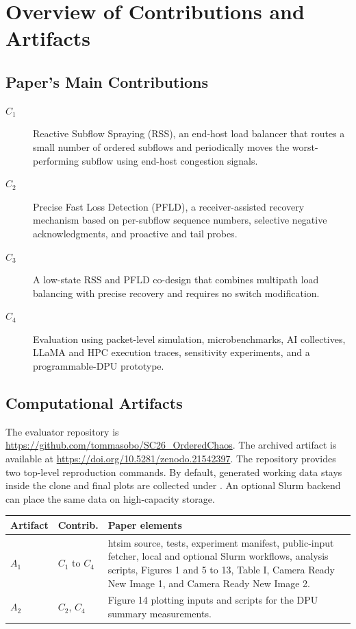 \documentclass[conference]{IEEEtran}
\begin{document}

\appendixAD
\section{Overview of Contributions and Artifacts}

\subsection{Paper's Main Contributions}
\begin{description}
\item[$C_1$] Reactive Subflow Spraying (RSS), an end-host load balancer that
routes a small number of ordered subflows and periodically moves the
worst-performing subflow using end-host congestion signals.
\item[$C_2$] Precise Fast Loss Detection (PFLD), a receiver-assisted recovery
mechanism based on per-subflow sequence numbers, selective negative
acknowledgments, and proactive and tail probes.
\item[$C_3$] A low-state RSS and PFLD co-design that combines multipath load
balancing with precise recovery and requires no switch modification.
\item[$C_4$] Evaluation using packet-level simulation, microbenchmarks, AI
collectives, LLaMA and HPC execution traces, sensitivity experiments, and a
programmable-DPU prototype.
\end{description}

\subsection{Computational Artifacts}
The evaluator repository is
\url{https://github.com/tommasobo/SC26_OrderedChaos}. The archived artifact is
available at \url{https://doi.org/10.5281/zenodo.21542397}. The repository
provides two top-level reproduction commands. By default, generated working
data stays inside the clone and final plots are collected under
. An optional Slurm backend can place the same data on
high-capacity storage.

\begin{center}
\footnotesize
\begin{tabular}{@{}p{}p{}p{}@{}}
\toprule
Artifact & Contrib. & Paper elements \\
\midrule
$A_1$ & $C_1$ to $C_4$ & htsim source, tests, experiment manifest, public-input
fetcher, local and optional Slurm workflows, analysis scripts, Figures 1 and
5 to 13, Table I,
Camera Ready New Image 1, and Camera Ready New Image 2. \\
\midrule
$A_2$ & $C_2$, $C_4$ & Figure 14 plotting inputs and scripts for the DPU
summary measurements. \\
\bottomrule
\end{tabular}
\end{center}
\end{document}
